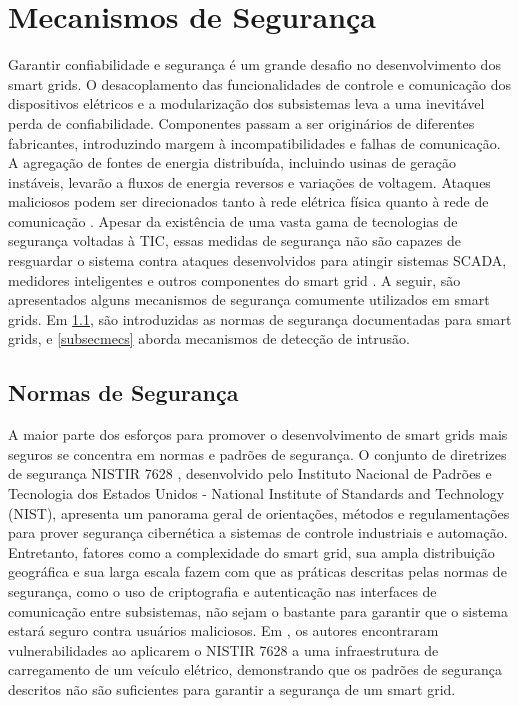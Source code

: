 \documentclass[cic,tc]{iiufrgs}
\begin{document}
\section{Mecanismos de Segurança}
\label{secmec}
Garantir confiabilidade e segurança é um grande desafio no desenvolvimento dos smart grids. O desacoplamento das funcionalidades de controle e comunicação dos dispositivos elétricos e a modularização dos subsistemas leva a uma inevitável perda de confiabilidade. Componentes passam a ser originários de diferentes fabricantes, introduzindo margem à incompatibilidades e falhas de comunicação. A agregação de fontes de energia distribuída, incluindo usinas de geração instáveis, levarão a fluxos de energia reversos e variações de voltagem. Ataques maliciosos podem ser direcionados tanto à rede elétrica física quanto à rede de comunicação \cite{li2012securing}. Apesar da existência de uma vasta gama de tecnologias de segurança voltadas à TIC, essas medidas de segurança não são capazes de resguardar o sistema contra ataques desenvolvidos para atingir sistemas SCADA, medidores inteligentes e outros componentes do smart grid \cite{carcano2011multidim}.
A seguir, são apresentados alguns mecanismos de segurança comumente utilizados em smart grids. Em \ref{subsecnormas}, são introduzidas as normas de segurança documentadas para smart grids, e \ref{subsecmecs} aborda mecanismos de detecção de intrusão.

\subsection{Normas de Segurança}
\label{subsecnormas}
A maior parte dos esforços para promover o desenvolvimento de smart grids mais seguros se concentra em normas e padrões de segurança. O conjunto de diretrizes de segurança NISTIR 7628 \cite{nistir7628}, desenvolvido pelo Instituto Nacional de Padrões e Tecnologia dos Estados Unidos - National Institute of Standards and Technology (NIST), apresenta um panorama geral de orientações, métodos e regulamentações para prover segurança cibernética a sistemas de controle industriais e automação. Entretanto, fatores como a complexidade do smart grid, sua ampla distribuição geográfica e sua larga escala fazem com que as práticas descritas pelas normas de segurança, como o uso de criptografia e autenticação nas interfaces de comunicação entre subsistemas, não sejam o bastante para garantir que o sistema estará seguro contra usuários maliciosos. Em \cite{chan2013cybersecurity}, os autores encontraram vulnerabilidades ao aplicarem o NISTIR 7628 a uma infraestrutura de carregamento de um veículo elétrico, demonstrando que os padrões de segurança descritos não são suficientes para garantir a segurança de um smart grid.
\end{document}
